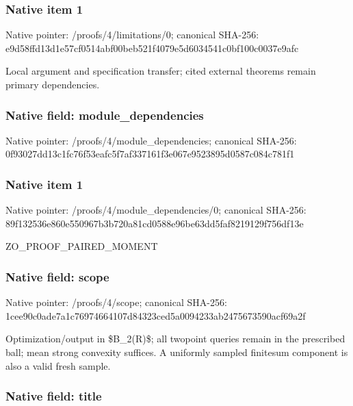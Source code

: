 \documentclass[10pt,a4paper]{article}
\begin{document}
\subsubsection{Native item 1}


Native pointer: /proofs/4/limitations/0; canonical SHA-256: e9d58ffd13d1e57cf0514abf\allowbreak{}00beb521f4079e5d6034541c\allowbreak{}0bf100c0037e9afc


Local argument and specification transfer; cited external theorems remain primary dependencies.


\subsubsection{Native field: module\_dependencies}


Native pointer: /proofs/4/module\_dependencies; canonical SHA-256: 0f93027dd13c1fc76f53eafc\allowbreak{}5f7af337161f3e067e952389\allowbreak{}5d0587c084c781f1



\subsubsection{Native item 1}


Native pointer: /proofs/4/module\_dependencies/0; canonical SHA-256: 89f132536e860e550967b3b7\allowbreak{}20a81cd0588e96be63dd5faf\allowbreak{}8219129f756df13e


ZO\_PROOF\_PAIRED\_MOMENT


\subsubsection{Native field: scope}


Native pointer: /proofs/4/scope; canonical SHA-256: 1cee90c0ade7a1c769746641\allowbreak{}07d84323ced5a0094233ab24\allowbreak{}75673590acf69a2f


Optimization/output in \$B\_2(R)\$; all twopoint queries remain in the prescribed ball; mean strong convexity suffices. A uniformly sampled finitesum component is also a valid fresh sample.


\subsubsection{Native field: title}
\end{document}
